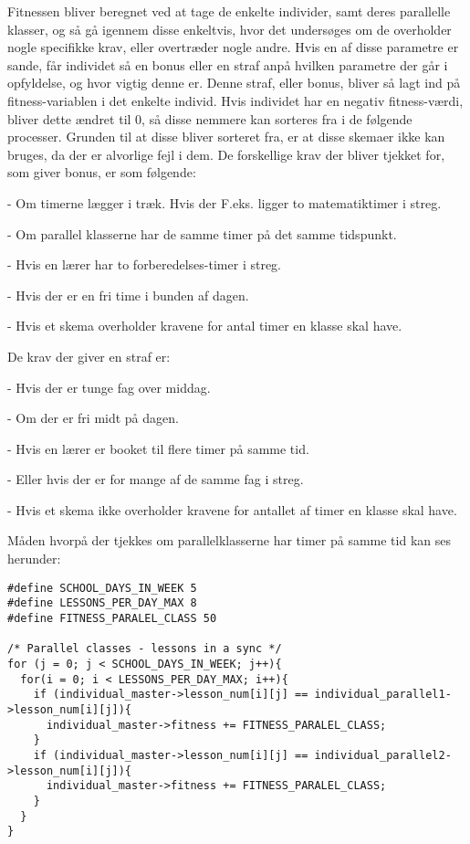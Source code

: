 Fitnessen bliver beregnet ved at tage de enkelte individer, samt deres parallelle klasser, og så gå igennem disse enkeltvis, hvor det undersøges om de overholder nogle specifikke krav, eller overtræder nogle andre. Hvis en af disse parametre er sande, får individet så en bonus eller en straf anpå hvilken parametre der går i opfyldelse, og hvor vigtig denne er. Denne straf, eller bonus, bliver så lagt ind på fitness-variablen i det enkelte individ. Hvis individet har en negativ fitness-værdi, bliver dette ændret til 0, så disse nemmere kan sorteres fra i de følgende processer. Grunden til at disse bliver sorteret fra, er at disse skemaer ikke kan bruges, da der er alvorlige fejl i dem.
De forskellige krav der bliver tjekket for, som giver bonus, er som følgende:

   -	Om timerne lægger i træk. Hvis der F.eks. ligger to matematiktimer i streg.
   
   -	Om parallel klasserne har de samme timer på det samme tidspunkt. 
   
   -	Hvis en lærer har to forberedelses-timer i streg.
   
   -	Hvis der er en fri time i bunden af dagen.
   
   -	Hvis et skema overholder kravene for antal timer en klasse skal have.
   
   
De krav der giver en straf er:

   -	Hvis der er tunge fag over middag.
   
   -	Om der er fri midt på dagen.
   
   -	Hvis en lærer er booket til flere timer på samme tid.
   
   -	Eller hvis der er for mange af de samme fag i streg.
   
   -	Hvis et skema ikke overholder kravene for antallet af timer en klasse skal have.

Måden hvorpå der tjekkes om parallelklasserne har timer på samme tid kan ses herunder:

\begin{lstlisting}
#define SCHOOL_DAYS_IN_WEEK 5
#define LESSONS_PER_DAY_MAX 8
#define FITNESS_PARALEL_CLASS 50

/* Parallel classes - lessons in a sync */
for (j = 0; j < SCHOOL_DAYS_IN_WEEK; j++){
  for(i = 0; i < LESSONS_PER_DAY_MAX; i++){
    if (individual_master->lesson_num[i][j] == individual_parallel1->lesson_num[i][j]){
      individual_master->fitness += FITNESS_PARALEL_CLASS;
    }
    if (individual_master->lesson_num[i][j] == individual_parallel2->lesson_num[i][j]){
      individual_master->fitness += FITNESS_PARALEL_CLASS;
    }
  }
}
\end{lstlisting}

